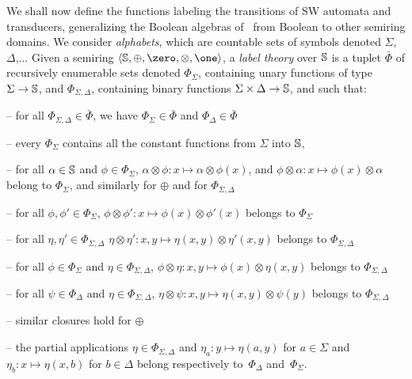 %
%
We shall now define the functions labeling the transitions of SW automata and transducers,
generalizing the Boolean algebras of~\cite{dAntoniVeanes17CAV} 
from Boolean to other semiring domains.
%
We consider \emph{alphabets}, which are countable sets of symbols 
denoted $\Sigma$, $\Delta$,...
%
\noindent 
Given a semiring $\< \Semiring, \oplus, \zero, \otimes, \one>$, 
a \emph{label theory} over $\mathbb{S}$
is a tuplet $\bar\Phi$ of recursively enumerable sets denoted
$\Phi_\Sigma$, %
containing unary functions of type $\Sigma \to \mathbb{S}$, %
and $\Phi_{\Sigma, \Delta}$, containing binary functions $\Sigma \times \Delta \to \mathbb{S}$, 
and such that:

\noindent -- 
for all $\Phi_{\Sigma, \Delta} \in \bar\Phi$, we have
$\Phi_{\Sigma} \in \bar\Phi$ and $\Phi_{\Delta} \in \bar\Phi$

\noindent -- 
every $\Phi_{\Sigma}$ contains all the constant functions from $\Sigma$ into $\mathbb{S}$, 
 
\noindent -- 
for all $\alpha \in \mathbb{S}$ and $\phi \in \Phi_\Sigma$,
      $\alpha \otimes \phi : x \mapsto \alpha \otimes \phi(x)$, 
      and $\phi \otimes \alpha : x \mapsto \phi(x) \otimes \alpha$\\
\phantom{--} belong to $\Phi_\Sigma$, and similarly for $\oplus$ 
      and for $\Phi_{\Sigma, \Delta}$

\noindent -- 
for all $\phi, \phi' \in \Phi_\Sigma$,
$\phi \otimes \phi': x \mapsto \phi(x) \otimes \phi'(x)$ belongs to $\Phi_\Sigma$

\noindent -- 
for all $\eta, \eta' \in \Phi_{\Sigma, \Delta}$
$\eta \otimes \eta': x, y \mapsto \eta(x, y) \otimes \eta'(x, y)$ belongs to $\Phi_{\Sigma, \Delta}$

\noindent -- 
for all $\phi \in \Phi_\Sigma$ and $\eta \in \Phi_{\Sigma, \Delta}$,
$\phi \otimes \eta: x, y \mapsto \phi(x) \otimes \eta(x, y)$ belongs to $\Phi_{\Sigma, \Delta}$

\noindent -- 
for all $\psi \in \Phi_\Delta$ and $\eta \in \Phi_{\Sigma, \Delta}$,
$\eta \otimes \psi: x, y \mapsto \eta(x, y) \otimes \psi(y)$ belongs to $\Phi_{\Sigma, \Delta}$

\noindent -- 
similar closures hold for $\oplus$

\noindent -- 
the partial applications $\eta \in \Phi_{\Sigma, \Delta}$
and $\eta_a: y \mapsto \eta(a, y)$ for $a \in \Sigma$ %
and\\ 
\phantom{--} $\eta_b: x \mapsto \eta(x, b)$ for $b \in \Delta$ %
belong respectively to~$\Phi_\Delta$ and~$\Phi_\Sigma$.


